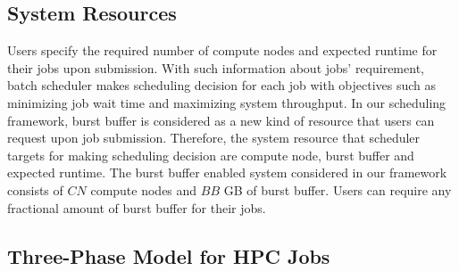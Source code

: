 \subsection{System Resources}

Users specify the required number of compute nodes and expected runtime for their jobs upon submission. 
With such information about jobs' requirement, 
batch scheduler makes scheduling decision for each job with objectives 
such as minimizing job wait time and maximizing system throughput. 
In our scheduling framework, 
burst buffer is considered as a new kind of resource that users can request upon job submission. 
Therefore, the system resource that scheduler targets for making scheduling decision are compute node, 
burst buffer and expected runtime. 
The burst buffer enabled system considered in our framework consists of 
$CN$ compute nodes and $BB$ GB of burst buffer. 
Users can require any fractional amount of burst buffer for their jobs. 



\subsection{Three-Phase Model for HPC Jobs}


